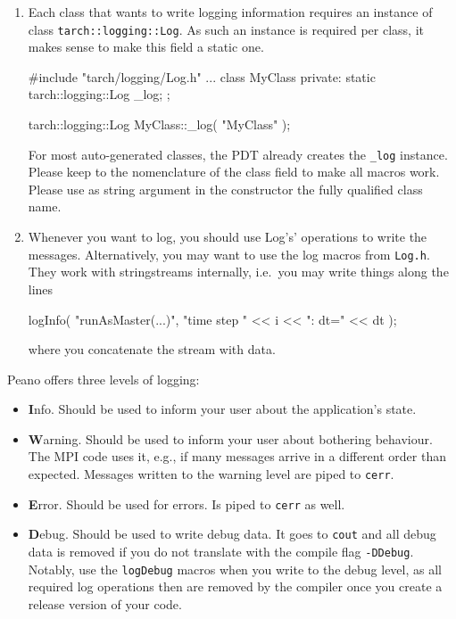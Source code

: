 \begin{enumerate}
  \item Each class that wants to write logging information requires an instance
  of class \texttt{tarch::logging::Log}. As such an instance is required per
  class, it makes sense to make this field a static one.
  \begin{code}
  #include "tarch/logging/Log.h"
  ...
  class MyClass {
    private:
      static tarch::logging::Log  _log;
  };
  
  tarch::logging::Log  MyClass::_log( "MyClass" );
  \end{code}
  For most auto-generated classes, the PDT already creates the \texttt{\_log}
  instance. Please keep to the nomenclature of the class field to make all
  macros work. Please use as string argument in the constructor the fully
  qualified class name.
  \item Whenever you want to log, you should use Log's' operations to write the
  messages. Alternatively, you may want to use the log macros from
  \texttt{Log.h}. They work with stringstreams internally, i.e.~you may write
  things along the lines
  \begin{code}
logInfo( "runAsMaster(...)", "time step " << i << ": dt=" << dt );
  \end{code}
  where you concatenate the stream with data.
\end{enumerate}

Peano offers three levels of logging:
\begin{itemize}
  \item {\textbf Info}. Should be used to inform your user about the application's
  state.
  \item {\textbf Warning}. Should be used to inform your user about bothering
  behaviour.
  The MPI code uses it, e.g., if many messages arrive in a different order than
  expected. Messages written to the warning level are piped to
  \texttt{cerr}.
  \item {\textbf Error}. Should be used for errors. Is piped to \texttt{cerr} as
  well.
  \item {\textbf Debug}. Should be used to write debug data. It goes to
  \texttt{cout} and all debug data is removed if you do not translate with the compile flag
  \texttt{-DDebug}. Notably, use the \texttt{logDebug} macros when you write to
  the debug level, as all required log operations then are removed by the
  compiler once you create a release version of your code.
\end{itemize}



